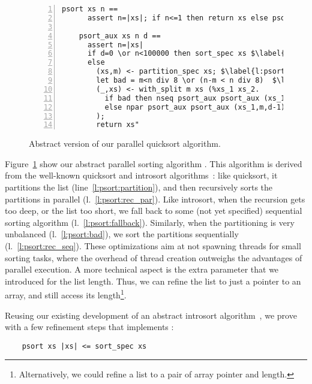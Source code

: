 \documentclass[sn-mathphys,Numbered]{sn-jnl}
\theoremstyle{thmstyleone}%
\theoremstyle{definition}%
\theoremstyle{thmstylethree}%
\begin{document}
  \begin{figure}
  \begin{lstlisting}[numbers=left,xleftmargin=1.9em,frame=single,framexleftmargin=.5em]
    psort xs n ==
      assert n=|xs|; if n<=1 then return xs else psort_aux$\hspace*{-1pt}$ xs$\hspace*{-1pt}$ n$\hspace*{-1pt}$ (log2$\hspace*{-1pt}$ n$\hspace*{-1pt}$ *$\hspace*{-1pt}$ 2)

    psort_aux xs n d ==
      assert n=|xs|
      if d=0 \or n<100000 then sort_spec xs $\label{l:psort:fallback}$
      else
        (xs,m) <- partition_spec xs; $\label{l:psort:partition}$
        let bad = m<n div 8 \or (n-m < n div 8)  $\label{l:psort:bad}$
        (_,xs) <- with_split m xs (%xs_1 xs_2.
          if bad then nseq psort_aux psort_aux (xs_1,m,d-1) (xs_2,n-m,d-1) $\label{l:psort:rec_seq}$
          else npar psort_aux psort_aux (xs_1,m,d-1) (xs_2,n-m,d-1)  $\label{l:psort:rec_par}$
        );
        return xs"
  \end{lstlisting}
  \caption{Abstract version of our parallel quicksort algorithm.}\label{fig:psort}
  \end{figure}

  Figure~\ref{fig:psort} show our abstract parallel sorting algorithm .
  This algorithm is derived from the well-known quicksort and introsort algorithms~\cite{Muss97}:
  like quicksort, it partitions the list (line~\ref{l:psort:partition}), and then recursively sorts the partitions in parallel (l.~\ref{l:psort:rec_par}).
  Like introsort, when the recursion gets too deep, or the list too short, we fall back to
  some (not yet specified) sequential sorting algorithm (l.~\ref{l:psort:fallback}). Similarly, when the partitioning is very unbalanced (l.~\ref{l:psort:bad}),
  we sort the partitions sequentially (l.~\ref{l:psort:rec_seq}). These optimizations aim at not spawning threads for small sorting tasks, where
  the overhead of thread creation outweighs the advantages of parallel execution.
  A more technical aspect is the extra parameter  that we introduced for the list length.
  Thus, we can refine the list to just a pointer to an array, and still access its length\footnote{Alternatively, we could refine a list to a pair of array pointer and length.}.

  Reusing our existing development of an abstract introsort algorithm~\cite{La20},
  we prove with a few refinement steps that  implements :
  \begin{lstlisting}
    psort xs |xs| <= sort_spec xs
  \end{lstlisting}
\end{document}
